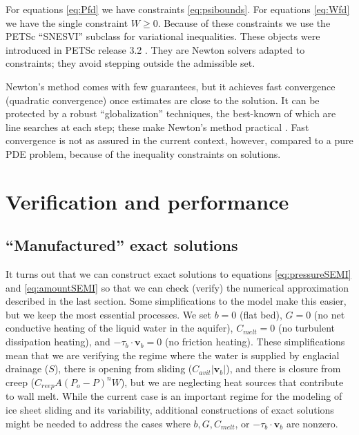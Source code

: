 \documentclass[11pt]{amsart}
\newcommand{\bv}{\mathbf{v}}
\newcommand{\Cavit}{C_{avit}}
\newcommand{\Cmelt}{C_{melt}}
\newcommand{\Creep}{C_{reep}}
\begin{document}
For equations \eqref{eq:Pfd} we have constraints \eqref{eq:psibounds}.  For equations \eqref{eq:Wfd} we have the single constraint $W\ge 0$.  Because of these constraints we use the PETSc ``SNESVI'' subclass for variational inequalities.  These objects were introduced in PETSc release 3.2 \citep{petsc-user-ref}.  They are Newton solvers adapted to constraints; they avoid stepping outside the admissible set.

Newton's method comes with few guarantees, but it achieves fast convergence (quadratic convergence) once estimates are close to the solution.  It can be protected by a robust ``globalization'' techniques, the best-known of which are line searches at each step; these make Newton's method practical \citep{Kelley}.  Fast convergence is not as assured in the current context, however, compared to a pure PDE problem, because of the inequality constraints on solutions.

\section{Verification and performance} \label{sec:verification}

\subsection*{``Manufactured'' exact solutions}  It turns out that we can construct exact solutions to equations \eqref{eq:pressureSEMI} and \eqref{eq:amountSEMI} so that we can check (verify) the numerical approximation described in the last section.  Some simplifications to the model make this easier, but we keep the most essential processes.  We set $b=0$ (flat bed), $G=0$ (no net conductive heating of the liquid water in the aquifer), $\Cmelt=0$ (no turbulent dissipation heating), and $-\tau_b\cdot \bv_b=0$ (no friction heating).  These simplifications mean that we are verifying the regime where the water is supplied by englacial drainage ($S$), there is opening from sliding ($\Cavit |\bv_b|$), and there is closure from creep ($\Creep A(P_o - P)^n W$), but we are neglecting heat sources that contribute to wall melt.  While the current case is an important regime for the modeling of ice sheet sliding and its variability, additional constructions of exact solutions might be needed to address the cases where $b,G,\Cmelt$, or $-\tau_b\cdot \bv_b$ are nonzero.
\end{document}
